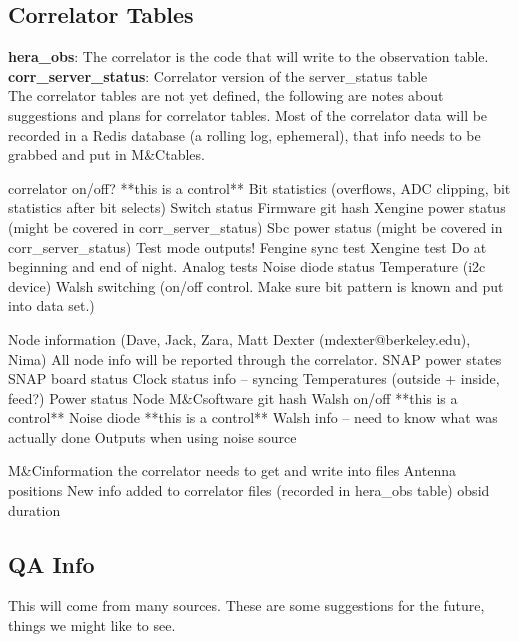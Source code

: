 \documentclass{article}
\newcommand{\mc}{M\&C}
\begin{document}
\subsection{Correlator Tables}
\textbf{\large{hera\_obs}}: The correlator is the code that will write to the observation table.\\

\textbf{\large{corr\_server\_status}}: Correlator version of the server\_status table\\

The correlator tables are not yet defined, the following are notes about suggestions and plans for correlator tables. Most of the correlator data will be recorded in a Redis database (a rolling log, ephemeral), that info needs to be grabbed and put in \mc tables.
\begin{outline}[enumerate]
	\1 correlator on/off?	**this is a control**
	\1 Bit statistics (overflows, ADC clipping, bit statistics after bit selects)
	\1 Switch status
	\1 Firmware git hash
	\1 Xengine power status (might be covered in corr\_server\_status)
	\1 Sbc power status (might be covered in corr\_server\_status)
	\1 Test mode outputs!
		\2 Fengine sync test
		\2 Xengine test
		\2 Do at beginning and end of night.
		\2 Analog tests
			\3 Noise diode status
			\3 Temperature (i2c device)
			\3 Walsh switching (on/off control. Make sure bit pattern is known and put into data set.)

	\1 Node information (Dave, Jack, Zara, Matt Dexter (mdexter@berkeley.edu), Nima) All node info will be reported through the correlator.
		\2 SNAP power states
		\2 SNAP board status
		\2 Clock status info -- syncing
		\2 Temperatures (outside + inside, feed?)
		\2 Power status
		\2 Node \mc software git hash
		\2 Walsh on/off	**this is a control**
		\2 Noise diode	**this is a control**
		\2 Walsh info -- need to know what was actually done
		\2 Outputs when using noise source

	\1 \mc information the correlator needs to get and write into files
		\2 Antenna positions
	\1 New info added to correlator files (recorded in hera\_obs table)
		\2 obsid
		\2 duration
\end{outline}

\subsection{QA Info}
This will come from many sources. These are some suggestions for the future, things we might like to see.
\end{document}
